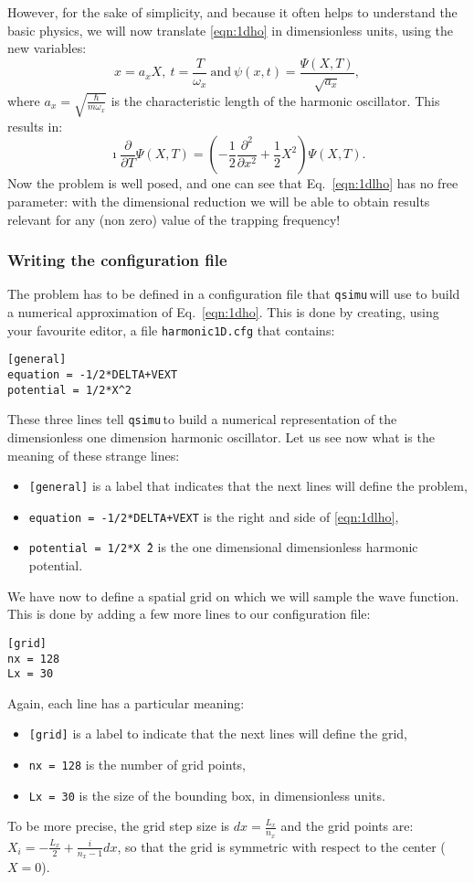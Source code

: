 \documentclass[12pt,a4paper]{report}
\newcommand{\qsimu}{\texttt{qsimu}\,}
\begin{document}
However, for the sake of simplicity, and because it often helps to understand the basic physics, we will now translate \eqref{eqn:1dho} in dimensionless units, using the new variables:
\begin{equation*}
x=a_xX,~t=\frac{T}{\omega_x}~\textrm{and}~\psi(x,t)=\frac{\Psi(X,T)}{\sqrt{a_x}},
\end{equation*}
where $a_x=\sqrt{\frac{\hbar}{m\omega_x}}$ is the characteristic length of the harmonic oscillator.
This results in:
\begin{equation}
\imath\frac{\partial}{\partial T}\Psi(X,T)=\left(-\frac{1}{2}\frac{\partial^2}{\partial x^2}+\frac{1}{2}X^2\right)\Psi(X,T).
\label{eqn:1dlho}
\end{equation}
Now the problem is well posed, and one can see that Eq.~\eqref{eqn:1dlho} has no free parameter: with the dimensional reduction we will be able to obtain results relevant for any (non zero) value of the trapping frequency!

\subsubsection{Writing the configuration file}
The problem has to be defined in a configuration file that \qsimu will use to build a numerical approximation of Eq.~\eqref{eqn:1dho}.
This is done by creating, using your favourite editor, a file \texttt{harmonic1D.cfg} that contains:
\begin{verbatim}
[general]
equation = -1/2*DELTA+VEXT
potential = 1/2*X^2
\end{verbatim}
These three lines tell \qsimu to build a numerical representation of the dimensionless one dimension harmonic oscillator.
Let us see now what is the meaning of these strange lines:
\begin{itemize}
\item\texttt{[general]} is a label that indicates that the next lines will define the problem,
\item\texttt{equation = -1/2*DELTA+VEXT} is the right and side of \eqref{eqn:1dlho},
\item\texttt{potential = 1/2*X\^\,2} is the one dimensional dimensionless harmonic potential.
\end{itemize}

We have now to define a spatial grid on which we will sample the wave function.
This is done by adding a few more lines to our configuration file:
\begin{verbatim}
[grid]
nx = 128
Lx = 30
\end{verbatim}
Again, each line has a particular meaning:
\begin{itemize}
\item \texttt{[grid]} is a label to indicate that the next lines will define the grid,
\item \texttt{nx = 128} is the number of grid points,
\item \texttt{Lx = 30} is the size of the bounding box, in dimensionless units.
\end{itemize}
To be more precise, the grid step size is $dx=\frac{L_x}{n_x}$ and the grid points are: $X_i=-\frac{L_x}{2}+\frac{i}{n_x-1}dx$, so that the grid is symmetric with respect to the center ($X=0$).
\end{document}
